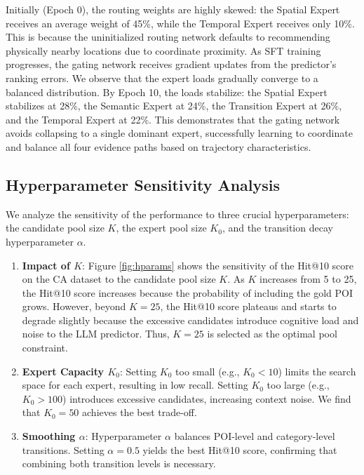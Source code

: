 \documentclass[10pt,twocolumn]{article}
\begin{document}
Initially (Epoch 0), the routing weights are highly skewed: the Spatial Expert receives an average weight of 45\%, while the Temporal Expert receives only 10\%. This is because the uninitialized routing network defaults to recommending physically nearby locations due to coordinate proximity. As SFT training progresses, the gating network receives gradient updates from the predictor's ranking errors. We observe that the expert loads gradually converge to a balanced distribution. By Epoch 10, the loads stabilize: the Spatial Expert stabilizes at 28\%, the Semantic Expert at 24\%, the Transition Expert at 26\%, and the Temporal Expert at 22\%. This demonstrates that the gating network avoids collapsing to a single dominant expert, successfully learning to coordinate and balance all four evidence paths based on trajectory characteristics.

\subsection{Hyperparameter Sensitivity Analysis}
We analyze the sensitivity of the performance to three crucial hyperparameters: the candidate pool size $K$, the expert pool size $K_0$, and the transition decay hyperparameter $\alpha$.
\begin{enumerate}
    \item \textbf{Impact of $K$}: Figure \ref{fig:hparams} shows the sensitivity of the Hit@10 score on the CA dataset to the candidate pool size $K$. As $K$ increases from 5 to 25, the Hit@10 score increases because the probability of including the gold POI grows. However, beyond $K=25$, the Hit@10 score plateaus and starts to degrade slightly because the excessive candidates introduce cognitive load and noise to the LLM predictor. Thus, $K=25$ is selected as the optimal pool constraint.
    \item \textbf{Expert Capacity $K_0$}: Setting $K_0$ too small (e.g., $K_0 < 10$) limits the search space for each expert, resulting in low recall. Setting $K_0$ too large (e.g., $K_0 > 100$) introduces excessive candidates, increasing context noise. We find that $K_0 = 50$ achieves the best trade-off.
    \item \textbf{Smoothing $\alpha$}: Hyperparameter $\alpha$ balances POI-level and category-level transitions. Setting $\alpha = 0.5$ yields the best Hit@10 score, confirming that combining both transition levels is necessary.
\end{enumerate}
\end{document}
